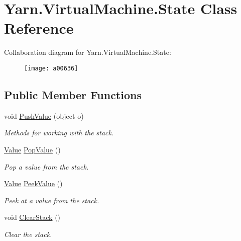 \hypertarget{a00148}{\section{Yarn.\-Virtual\-Machine.\-State Class Reference}
\label{a00148}
}


Collaboration diagram for Yarn.\-Virtual\-Machine.\-State\-:
\nopagebreak
\begin{figure}[H]
\begin{center}
\leavevmode
\texttt{[image: a00636]}
\end{center}
\end{figure}
\subsection*{Public Member Functions}
\begin{DoxyCompactItemize}
\item 
void \hyperlink{a00148_aace44f5b85b9f746fede834becda4a8e}{Push\-Value} (object o)
\begin{DoxyCompactList}\small\item\em Methods for working with the stack. \end{DoxyCompactList}\item 
\hyperlink{a00165}{Value} \hyperlink{a00148_a36881a888ea2839d74c3d4e7c199f4ee}{Pop\-Value} ()
\begin{DoxyCompactList}\small\item\em Pop a value from the stack. \end{DoxyCompactList}\item 
\hyperlink{a00165}{Value} \hyperlink{a00148_a54fd5b64ec94e937e771846167242dc2}{Peek\-Value} ()
\begin{DoxyCompactList}\small\item\em Peek at a value from the stack. \end{DoxyCompactList}\item 
void \hyperlink{a00148_a9c787097fbbbbf1680e4960cda092535}{Clear\-Stack} ()
\begin{DoxyCompactList}\small\item\em Clear the stack. \end{DoxyCompactList}\end{DoxyCompactItemize}
